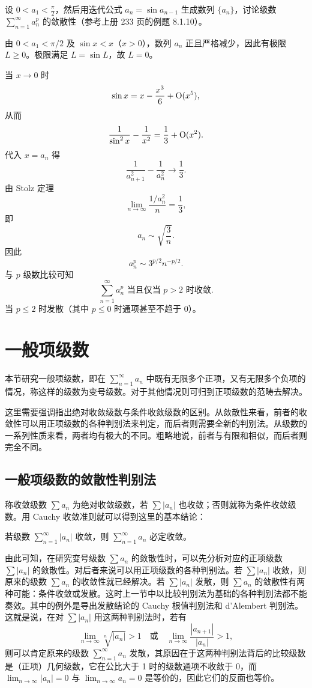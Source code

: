 \begin{xexercise}[15]
设 $0<a_1<\frac\pi2$，然后用迭代公式 $a_n=\sin a_{n-1}$ 生成数列 $\{a_n\}$，讨论级数 $\sum_{n=1}^{\infty}a_n^p$ 的敛散性（参考上册 233 页的例题 8.1.10）。
\end{xexercise}
\begin{xsolution}
由 $0<a_1<\pi/2$ 及 $\sin x<x$（$x>0$），数列 $a_n$ 正且严格减少，因此有极限 $L\geq0$。极限满足 $L=\sin L$，故 $L=0$。

当 $x\to0$ 时
\[
 \sin x=x-\frac{x^3}{6}+\mathrm{O}(x^5),
\]
从而
\[
 \frac1{\sin^2x}-\frac1{x^2}=\frac13+\mathrm{O}(x^2).
\]
代入 $x=a_n$ 得
\[
 \frac1{a_{n+1}^2}-\frac1{a_n^2}\longrightarrow\frac13.
\]
由 Stolz 定理
\[
 \lim_{n\to\infty}\frac{1/a_n^2}{n}=\frac13,
\]
即
\[
 a_n\sim\sqrt{\frac3n}.
\]
因此
\[
 a_n^p\sim3^{p/2}n^{-p/2}.
\]
与 $p$ 级数比较可知
\[
 \boxed{\sum_{n=1}^{\infty}a_n^p\text{ 当且仅当 }p>2\text{ 时收敛}.}
\]
当 $p\leq2$ 时发散（其中 $p\leq0$ 时通项甚至不趋于 $0$）。
\end{xsolution}


\section{一般项级数}

本节研究一般项级数，即在 $\sum_{n=1}^{\infty}a_n$ 中既有无限多个正项，又有无限多个负项的情况，称这样的级数为变号级数。对于其他情况则可归到正项级数的范畴去解决。

这里需要强调指出绝对收敛级数与条件收敛级数的区别。从敛散性来看，前者的收敛性可以用正项级数的各种判别法来判定，而后者则需要全新的判别法。从级数的一系列性质来看，两者均有极大的不同。粗略地说，前者与有限和相似，而后者则完全不同。

\subsection{一般项级数的敛散性判别法}

称收敛级数 $\sum a_n$ 为绝对收敛级数，若 $\sum|a_n|$ 也收敛；否则就称为条件收敛级数。用 Cauchy 收敛准则就可以得到这里的基本结论：

\begin{xproposition}[13.3.1]
若级数 $\sum_{n=1}^{\infty}|a_n|$ 收敛，则 $\sum_{n=1}^{\infty}a_n$ 必定收敛。
\end{xproposition}

由此可知，在研究变号级数 $\sum a_n$ 的敛散性时，可以先分析对应的正项级数 $\sum|a_n|$ 的敛散性。对后者来说可以用正项级数的各种判别法。若 $\sum|a_n|$ 收敛，则原来的级数 $\sum a_n$ 的收敛性就已经解决。若 $\sum|a_n|$ 发散，则 $\sum a_n$ 的敛散性有两种可能：条件收敛或发散。这时上一节中以比较判别法为基础的各种判别法都不能奏效。其中的例外是导出发散结论的 Cauchy 根值判别法和 d'Alembert 判别法。这就是说，在对 $\sum|a_n|$ 用这两种判别法时，若有
\[
\lim_{n\to\infty}\sqrt[n]{|a_n|}>1\quad\text{或}\quad
\lim_{n\to\infty}\frac{|a_{n+1}|}{|a_n|}>1,
\]
则可以肯定原来的级数 $\sum_{n=1}^{\infty}a_n$ 发散，其原因在于这两种判别法背后的比较级数是（正项）几何级数，它在公比大于 1 时的级数通项不收敛于 0，而 $\lim_{n\to\infty}|a_n|=0$ 与 $\lim_{n\to\infty}a_n=0$ 是等价的，因此它们的反面也等价。

